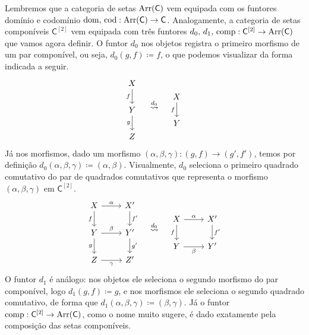 Lembremos que a categoria de setas $\mathrm{Arr}(\mathsf{C})$ vem equipada com os funtores domínio e codomínio $\mathrm{dom},\, \mathrm{cod}: \mathrm{Arr}(\mathsf{C}) \to \mathsf{C}$.
Analogamente, a categoria de setas componíveis $\mathsf{C}^{[2]}$ vem equipada com três funtores $d_{0},\, d_{1},\, \mathrm{comp}: \mathsf{C}^{[2]} \to \mathrm{Arr}(\mathsf{C})$ que vamos agora definir.
O funtor $d_{0}$ nos objetos registra o primeiro morfismo de um par componível, ou seja, $d_{0}(g,f) \coloneqq f$, o que podemos visualizar da forma indicada a seguir.
\begin{displaymath}
  \begin{tikzcd}
    X
    \arrow[d, "f" swap]
    \\ Y
    \arrow[d, "g" swap]
    \\ Z
  \end{tikzcd}
  \quad
  \overset{d_{0}}{\rightsquigarrow}
  \quad
  \begin{tikzcd}
    X
    \arrow[d, "f" swap]
    \\ Y
  \end{tikzcd}
\end{displaymath}
Já nos morfismos, dado um morfismo $(\alpha,\beta,\gamma): (g,f) \to (g',f')$, temos por definição $d_{0}(\alpha,\beta,\gamma) \coloneqq (\alpha,\beta)$.
Visualmente, $d_{0}$ seleciona o primeiro quadrado comutativo do par de quadrados comutativos que representa o morfismo $(\alpha,\beta,\gamma)$ em $\mathsf{C}^{[2]}$.
\begin{displaymath}
  \begin{tikzcd}
    X
    \arrow[d, "f" swap]
    \arrow[r, "\alpha"]
    & X'
    \arrow[d, "f'"]
    \\ Y
    \arrow[d, "g" swap]
    \arrow[r, "\beta"]
    & Y'
    \arrow[d, "g'"]
    \\ Z
    \arrow[r, "\gamma" swap]
    & Z'
  \end{tikzcd}
  \quad \overset{d_{0}}{\rightsquigarrow} \quad
  \begin{tikzcd}
    X
    \arrow[d, "f" swap]
    \arrow[r, "\alpha"]
    & X'
    \arrow[d, "f'"]
    \\ Y
    \arrow[r, "\beta" swap]
    & Y'
  \end{tikzcd}
\end{displaymath}
O funtor $d_{1}$ é análogo: nos objetos ele seleciona o segundo morfismo do par componível, logo $d_{1}(g,f) \coloneqq g$, e nos morfismos ele seleciona o segundo quadrado comutativo, de forma que $d_{1}(\alpha,\beta,\gamma) \coloneqq (\beta,\gamma)$.
Já o funtor $\mathrm{comp}: \mathsf{C}^{[2]} \to \mathrm{Arr}(\mathsf{C})$, como o nome muito sugere, é dado exatamente pela composição das setas componíveis.
